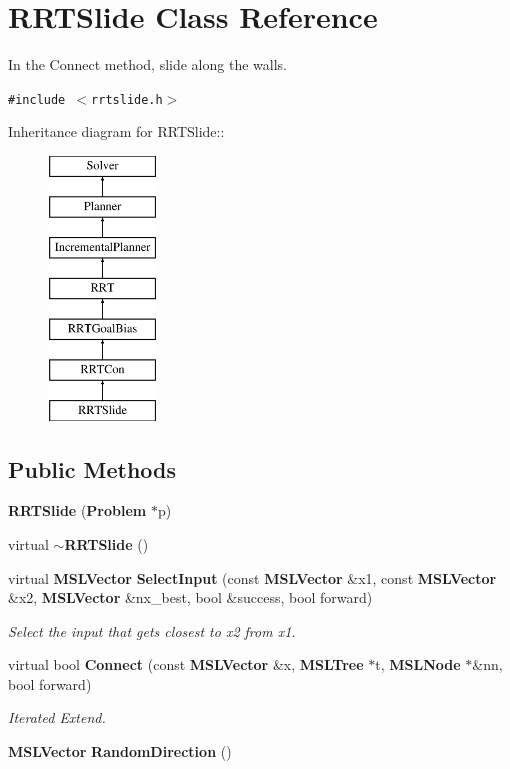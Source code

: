 \section{RRTSlide  Class Reference}
\label{class_RRTSlide}
In the Connect method, slide along the walls. 


{\tt \#include $<$rrtslide.h$>$}

Inheritance diagram for RRTSlide::\begin{figure}[H]
\begin{center}
\leavevmode
\includegraphics[height=7cm]{class_RRTSlide}
\end{center}
\end{figure}
\subsection*{Public Methods}
\begin{CompactItemize}
\item 
{\bf RRTSlide} ({\bf Problem} $\ast$p)
\item 
virtual {\bf $\sim$RRTSlide} ()
\item 
virtual {\bf MSLVector} {\bf Select\-Input} (const {\bf MSLVector} \&x1, const {\bf MSLVector} \&x2, {\bf MSLVector} \&nx\_\-best, bool \&success, bool forward)
\begin{CompactList}\small\item\em Select the input that gets closest to x2 from x1.\item\end{CompactList}\item 
virtual bool {\bf Connect} (const {\bf MSLVector} \&x, {\bf MSLTree} $\ast$t, {\bf MSLNode} $\ast$\&nn, bool forward)
\begin{CompactList}\small\item\em Iterated Extend.\item\end{CompactList}\item 
{\bf MSLVector} {\bf Random\-Direction} ()
\end{CompactItemize}
